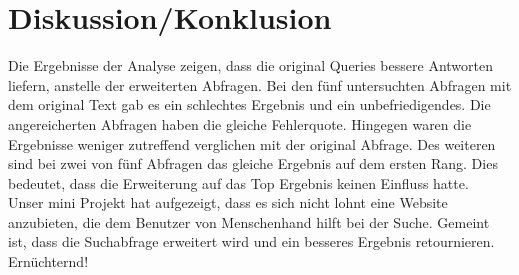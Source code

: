 \documentclass[a4paper, 10pt, ngerman, fleqn]{article}
\begin{document}
\section{Diskussion/Konklusion}
Die Ergebnisse der Analyse zeigen, dass die original Queries bessere Antworten liefern, anstelle der erweiterten Abfragen.
Bei den fünf untersuchten Abfragen mit dem original Text gab es ein schlechtes  Ergebnis und ein unbefriedigendes. Die angereicherten Abfragen haben die gleiche Fehlerquote. Hingegen waren die Ergebnisse weniger zutreffend verglichen mit der original Abfrage. Des weiteren sind bei zwei von fünf Abfragen das gleiche Ergebnis auf dem ersten Rang. Dies bedeutet, dass die Erweiterung auf das Top Ergebnis keinen Einfluss hatte.\\
Unser mini Projekt hat aufgezeigt, dass es sich nicht lohnt eine Website anzubieten, die dem Benutzer von Menschenhand hilft bei der Suche. Gemeint ist, dass die Suchabfrage erweitert wird und ein besseres Ergebnis retournieren. Ernüchternd!
\end{document}
